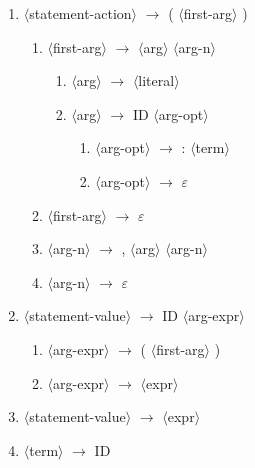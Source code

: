 \documentclass[11pt]{article}
\newcommand{\red}[1]{{\color{red} #1}}
\begin{document}
\begin{enumerate}[label=\arabic*., ref=\arabic*]
    \item $\langle$statement-action$\rangle$ $\rightarrow$ \red{(} $\langle$first-arg$\rangle$ \red{)}
    \begin{enumerate}[label=\arabic{enumi}.\arabic*., ref=\arabic{enumi}.\arabic*]
        \item $\langle$first-arg$\rangle$ $\rightarrow$ $\langle$arg$\rangle$ $\langle$arg-n$\rangle$
          \begin{enumerate}[label=\arabic{enumi}.\arabic{enumi}.\arabic*., ref=\arabic{enumi}.\arabic{enumi}.\arabic*]
                \item $\langle$arg$\rangle$ $\rightarrow$ $\langle$literal$\rangle$
                \item $\langle$arg$\rangle$ $\rightarrow$ \red{ID} $\langle$arg-opt$\rangle$
                \begin{enumerate}[label=\arabic{enumi}.\arabic{enumi}.\arabic{enumi}.\arabic*., ref=\arabic{enumi}.\arabic{enumi}.\arabic{enumi}.\arabic*]
                    \item $\langle$arg-opt$\rangle$ $\rightarrow$ \red{:} $\langle$term$\rangle$
                    \item $\langle$arg-opt$\rangle$ $\rightarrow$ \red{$\varepsilon$}
                \end{enumerate}
          \end{enumerate}
    \item $\langle$first-arg$\rangle$ $\rightarrow$ \red{$\varepsilon$}
    \item $\langle$arg-n$\rangle$ $\rightarrow$ \red{,} $\langle$arg$\rangle$ $\langle$arg-n$\rangle$
    \item $\langle$arg-n$\rangle$ $\rightarrow$ \red{$\varepsilon$}
\end{enumerate}
\item $\langle$statement-value$\rangle$ $\rightarrow$ \red{ID} $\langle$arg-expr$\rangle$
\begin{enumerate}[label=\arabic{enumi}.\arabic*., ref=\arabic{enumi}.\arabic*]
    \item $\langle$arg-expr$\rangle$ $\rightarrow$ \red{(} $\langle$first-arg$\rangle$ \red{)}
    \item $\langle$arg-expr$\rangle$ $\rightarrow$ $\langle$expr$\rangle$
\end{enumerate}
\item $\langle$statement-value$\rangle$ $\rightarrow$ $\langle$expr$\rangle$
\item $\langle$term$\rangle$ $\rightarrow$ \red{ID}

\end{enumerate}
\end{document}
